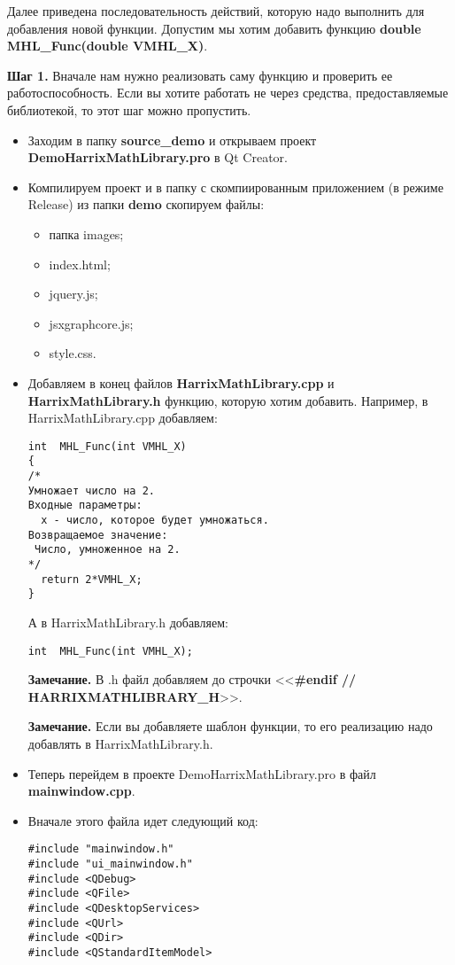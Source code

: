 \documentclass[a4paper,12pt]{article}
\begin{document}
Далее приведена последовательность действий, которую надо выполнить для добавления новой функции. Допустим мы хотим добавить функцию  \textbf{double MHL\_Func(double VMHL\_X)}.

\textbf{Шаг 1.}\label{step1} Вначале нам нужно реализовать саму функцию и проверить ее работоспособность. Если вы хотите работать не через средства, предоставляемые библиотекой, то этот шаг можно пропустить.

\begin{itemize}
\item Заходим в папку \textbf{source\_demo} и открываем проект \textbf{DemoHarrixMathLibrary.pro} в Qt Creator.
\item Компилируем проект и в папку с скомпиированным приложением (в режиме Release) из папки \textbf{demo} скопируем файлы:
\begin{itemize}
\item  папка images;
\item  index.html;
\item  jquery.js;
\item  jsxgraphcore.js;
\item  style.css.
\end {itemize}
\item Добавляем в конец файлов \textbf{HarrixMathLibrary.cpp} и \textbf{HarrixMathLibrary.h} функцию, которую хотим добавить. Например, в HarrixMathLibrary.cpp добавляем:
\begin{lstlisting}[label=examplefunction01, caption=Что добавляем в HarrixMathLibrary.cpp]
int  MHL_Func(int VMHL_X)
{
/*
Умножает число на 2.
Входные параметры:
  x - число, которое будет умножаться.
Возвращаемое значение:
 Число, умноженное на 2.
*/
  return 2*VMHL_X;
}
\end{lstlisting}
А в HarrixMathLibrary.h добавляем:
\begin{lstlisting}[label=examplefunction02, caption=Что добавляем в HarrixMathLibrary.h]
int  MHL_Func(int VMHL_X);
\end{lstlisting}
\textbf{Замечание.} В .h файл добавляем до строчки <<\textbf{\#endif // HARRIXMATHLIBRARY\_H}>>.

\textbf{Замечание.} Если вы добавляете шаблон функции, то его реализацию надо добавлять в HarrixMathLibrary.h.
\item Теперь перейдем в проекте DemoHarrixMathLibrary.pro в файл \textbf{mainwindow.cpp}.
\item Вначале этого файла идет следующий код:
\begin{lstlisting}[label=examplefunction03, caption=mainwindow.cpp]
#include "mainwindow.h"
#include "ui_mainwindow.h"
#include <QDebug>
#include <QFile>
#include <QDesktopServices>
#include <QUrl>
#include <QDir>
#include <QStandardItemModel>


\end{lstlisting}
\end{itemize}
\end{document}
